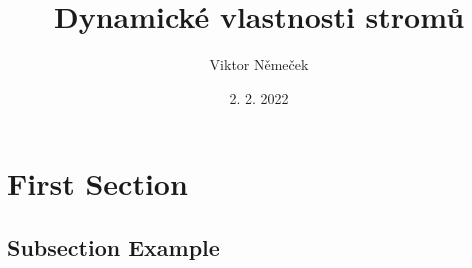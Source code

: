 \documentclass{beamer}
\title[Dynamické vlastnosti stromů]{Dynamické vlastnosti stromů} %
\author{Viktor Němeček} %
\institute[MFF UK] %
{
 \\ %
\medskip
\textit{} %
}
\date{2. 2. 2022} %
\begin{document}
\begin{frame}
\titlepage %
\end{frame}



\section{First Section} %

\subsection{Subsection Example} %
\end{document}
